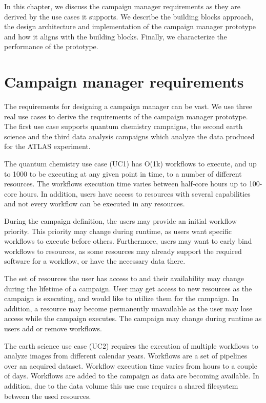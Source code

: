 In this chapter, we discuss the campaign manager requirements as they are derived by the use cases it supports.
We describe the building blocks approach, the design architecture and implementation of the campaign manager prototype and how it aligns with the building blocks.
Finally, we characterize the performance  of the prototype.

\section{Campaign manager requirements}
The requirements for designing a campaign manager can be vast.
We use three real use cases to derive the requirements of the campaign manager prototype.
The first use case supports quantum chemistry campaigns, the second earth science and the third data analysis campaigns which analyze the data produced for the ATLAS experiment.

The quantum chemistry use case (UC1) has O(1k) workflows to execute, and up to 1000 to be executing at any given point in time, to a number of different resources. 
The workflows execution time varies between half-core hours up to 100-core hours.
In addition, users have access to resources with several capabilities and not every workflow can be executed in any resources. 

During the campaign definition, the users may provide an initial workflow priority.
This priority may change during runtime, as users want specific workflows to execute before others.
Furthermore, users may want to early bind workflows to resources, as some resources may already support the required software for a workflow, or have the necessary data there.

The set of resources the user has access to and their availability may change during the lifetime of a campaign.
User may get access to new resources as the campaign is executing, and would like to utilize them for the campaign.
In addition, a resource may become permanently unavailable as the user may lose access while the campaign executes.
The campaign may change during runtime as users add or remove workflows.

The earth science use case (UC2) requires the execution of multiple workflows to analyze images from different calendar years.
Workflows are a set of pipelines over an acquired dataset.
Workflow execution time varies from hours to a couple of days.
Workflows are added to the campaign as data are becoming available.
In addition, due to the data volume this use case requires a shared filesystem between the used resources.

